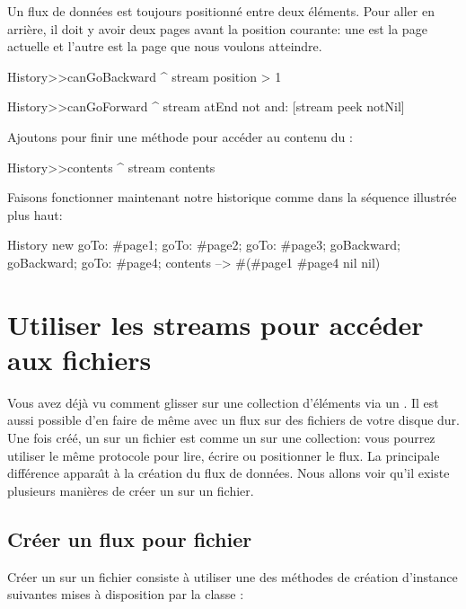 \documentclass[a4paper,10pt,twoside]{book}
\begin{document}
Un flux de donn\'ees est toujours positionn\'e entre deux \'el\'ements.
Pour aller en arri\`ere, il doit y avoir deux pages avant la position courante:
une est la page actuelle et l'autre est la page que nous voulons atteindre.

\begin{code}{}
History>>canGoBackward
  ^ stream position > 1

History>>canGoForward
  ^ stream atEnd not and: [stream peek notNil]
\end{code}

Ajoutons pour finir une m\'ethode pour acc\'eder au contenu du \stream:
\begin{code}{}
History>>contents
  ^ stream contents
\end{code}

Faisons fonctionner maintenant notre historique 
comme dans la s\'equence illustr\'ee plus haut:
\begin{code}{}
History new
	goTo: #page1;
	goTo: #page2;
	goTo: #page3;
	goBackward;
	goBackward;
	goTo: #page4;
	contents --> #(#page1 #page4 nil nil)
\end{code}

\section{Utiliser les streams pour acc\'eder aux fichiers}

Vous avez d\'ej\`a vu comment glisser sur une collection d'\'el\'ements via
un \stream. Il est aussi possible d'en faire de m\^eme avec un flux 
sur des fichiers de votre disque dur.
Une fois cr\'e\'e, un \stream sur un fichier est comme un \stream sur
une collection: vous pourrez utiliser le m\^eme protocole pour lire, \'ecrire
ou positionner le flux.
La principale diff\'erence appara\^{\i}t \`a la cr\'eation du flux de donn\'ees.
Nous allons voir qu'il existe plusieurs mani\`eres de cr\'eer un \stream sur un fichier.

\subsection{Cr\'eer un flux pour fichier}

Cr\'eer un \stream sur un fichier consiste \`a utiliser une des m\'ethodes
de cr\'eation d'instance suivantes mises \`a disposition par la classe
:
\end{document}

